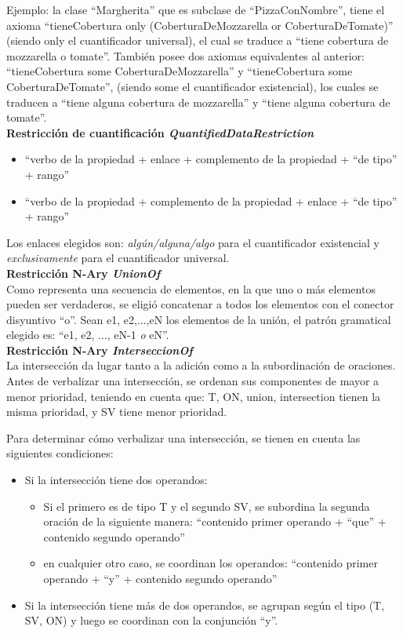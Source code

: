 Ejemplo: la clase ``Margherita'' que es subclase de ``PizzaConNombre'', tiene el axioma ``tieneCobertura only 
    (CoberturaDeMozzarella or CoberturaDeTomate)'' (siendo only el cuantificador universal), el cual se traduce a ``tiene cobertura de mozzarella o tomate''. También posee dos axiomas equivalentes al anterior: ``tieneCobertura some CoberturaDeMozzarella'' y ``tieneCobertura some CoberturaDeTomate'', (siendo some el cuantificador existencial), los cuales se traducen a ``tiene alguna cobertura de mozzarella'' y ``tiene alguna cobertura de tomate''.
\\

{\bf Restricción de cuantificación \emph{QuantifiedDataRestriction}}
\begin{itemize}
    \item ``verbo de la propiedad + enlace + complemento de la propiedad + ``de tipo'' + rango''
    \item ``verbo de la propiedad + complemento de la propiedad + enlace + ``de tipo'' + rango''
\end{itemize}
Los enlaces elegidos son: \emph{algún/alguna/algo} para el cuantificador existencial y \emph{exclusivamente} para el cuantificador universal.
\\

{\bf Restricción N-Ary \emph{UnionOf}} 
\\
Como representa una secuencia de elementos, en la que uno o más elementos pueden ser verdaderos, se eligió concatenar a todos los elementos con el conector disyuntivo ``o''. Sean e1, e2,...,eN los elementos de la unión, el patrón gramatical elegido es: ``e1, e2, ..., eN-1 \emph{o} eN''.
\\

{\bf Restricción N-Ary \emph{InterseccionOf}} \\
La intersección da lugar tanto a la adición como a la subordinación de oraciones. Antes de verbalizar una intersección, se ordenan sus componentes de mayor a menor prioridad, teniendo en cuenta que: T, ON, union, intersection tienen la misma prioridad, y SV tiene menor prioridad. 

Para determinar cómo verbalizar una intersección, se tienen en cuenta las siguientes condiciones:
\begin{itemize}
    \item Si la intersección tiene dos operandos:
        \begin{itemize}
            \item Si el primero es de tipo T  y el segundo SV, se subordina la segunda oración de la siguiente manera:
            ``contenido primer operando + ``que'' + contenido segundo operando''
            \item en cualquier otro caso, se coordinan los operandos:
            ``contenido primer operando + ``y'' + contenido segundo operando''
        \end{itemize}
        \item Si la intersección tiene más de dos operandos, se agrupan según el tipo  (T, SV, ON) y luego se coordinan con la conjunción ``y''.
        
\end{itemize}

